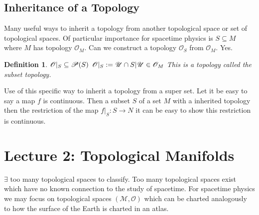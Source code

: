 \documentclass[10pt, oneside]{article}
\newcommand{\M}{\mathcal{M}}
\newtheorem{defn}{Definition}
\begin{document}
   \subsection*{Inheritance of a Topology}
      Many useful ways to inherit a topology from another topological space or set of topological spaces. Of particular importance for spacetime physics is $S \subseteq M$ where $M$ has topology $\mathcal{O}_M$.
      Can we construct a topology $\mathcal{O}_S$ from $\mathcal{O}_M$. Yes. 
      \begin{defn}
         $\mathcal{O} |_S \subseteq \mathcal{P}(S) \\$
         $\mathcal{O}|_S := {\mathcal{U} \cap S | \mathcal{U} \in \mathcal{O}_M} \\$
         This is a topology called the subset topology.
      \end{defn}
      Use of this specific way to inherit a topology from a super set. Let it be easy to say a map $f$ is continuous. Then a subset $S$ of a set $M$ with a inherited topology then the restriction of the map $f|_S: S \to N$ it can be easy to show this restriction is continuous.
\section*{Lecture 2: Topological Manifolds}
      $\exists$ too many topological spaces to classify. Too many topological spaces exist which have no known connection to the study of spacetime. For spacetime physics we may focus on topological spaces $(\M,\mathcal{O})$ which can be charted analogously to how the surface of the Earth is charted in an atlas.
\end{document}
